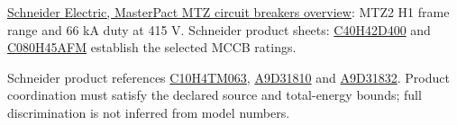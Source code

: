 \href{https://ckm-content.se.com/ckmContent/sfc/servlet.shepherd/document/download/0691H00000FWgC6QAL}{Schneider Electric, MasterPact MTZ circuit breakers overview}: MTZ2 H1 frame range and 66 kA duty at 415 V. Schneider product sheets: \href{https://www.se.com/nl/nl/product/C40H42D400/compact-vermogenschakelaar-nsx400h-70ka-ac-4p4d-400a-2-3/}{C40H42D400} and \href{https://www.se.com/uk/en/product/C080H45AFM/circuit-breaker-compact-ns800h-70ka-at-415vac-4p-fixed-manually-operated-micrologic-5-0a-control-unit-800a/}{C080H45AFM} establish the selected MCCB ratings.

Schneider product references \href{https://www.se.com/nl/en/product/C10H4TM063/}{C10H4TM063}, \href{https://www.se.com/uk/en/product/A9D31810/ic60h-earth-leakage-circuit-breaker-1p-\%2B-n-b-curve-10-a-30-ma-240-v/}{A9D31810} and \href{https://www.se.com/uk/en/product/A9D31832/ic60h-earth-leakage-circuit-breaker-1p-\%2B-n-b-curve-32-a-30-ma-240-v/}{A9D31832}. Product coordination must satisfy the declared source and total-energy bounds; full discrimination is not inferred from model numbers.

